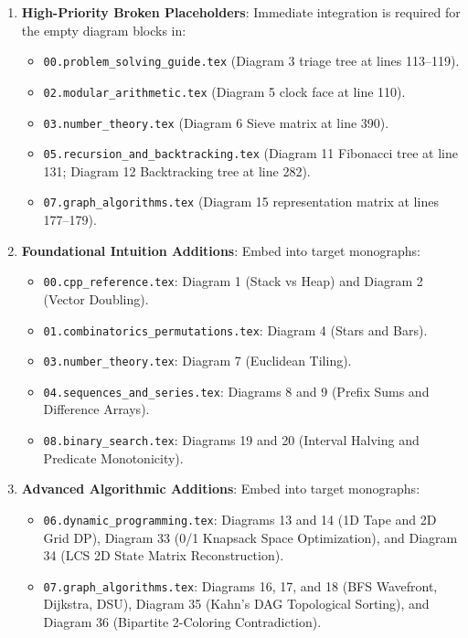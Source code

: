 \documentclass[11pt,a4paper]{article}
\begin{document}
\begin{enumerate}
    \item \textbf{High-Priority Broken Placeholders}:
    Immediate integration is required for the empty diagram blocks in:
    \begin{itemize}
        \item \texttt{00.problem\_solving\_guide.tex} (Diagram 3 triage tree at lines 113--119).
        \item \texttt{02.modular\_arithmetic.tex} (Diagram 5 clock face at line 110).
        \item \texttt{03.number\_theory.tex} (Diagram 6 Sieve matrix at line 390).
        \item \texttt{05.recursion\_and\_backtracking.tex} (Diagram 11 Fibonacci tree at line 131; Diagram 12 Backtracking tree at line 282).
        \item \texttt{07.graph\_algorithms.tex} (Diagram 15 representation matrix at lines 177--179).
    \end{itemize}
    \item \textbf{Foundational Intuition Additions}:
    Embed into target monographs:
    \begin{itemize}
        \item \texttt{00.cpp\_reference.tex}: Diagram 1 (Stack vs Heap) and Diagram 2 (Vector Doubling).
        \item \texttt{01.combinatorics\_permutations.tex}: Diagram 4 (Stars and Bars).
        \item \texttt{03.number\_theory.tex}: Diagram 7 (Euclidean Tiling).
        \item \texttt{04.sequences\_and\_series.tex}: Diagrams 8 and 9 (Prefix Sums and Difference Arrays).
        \item \texttt{08.binary\_search.tex}: Diagrams 19 and 20 (Interval Halving and Predicate Monotonicity).
    \end{itemize}
    \item \textbf{Advanced Algorithmic Additions}:
    Embed into target monographs:
    \begin{itemize}
        \item \texttt{06.dynamic\_programming.tex}: Diagrams 13 and 14 (1D Tape and 2D Grid DP), Diagram 33 (0/1 Knapsack Space Optimization), and Diagram 34 (LCS 2D State Matrix Reconstruction).
        \item \texttt{07.graph\_algorithms.tex}: Diagrams 16, 17, and 18 (BFS Wavefront, Dijkstra, DSU), Diagram 35 (Kahn's DAG Topological Sorting), and Diagram 36 (Bipartite 2-Coloring Contradiction).

\end{itemize}
\end{enumerate}
\end{document}
